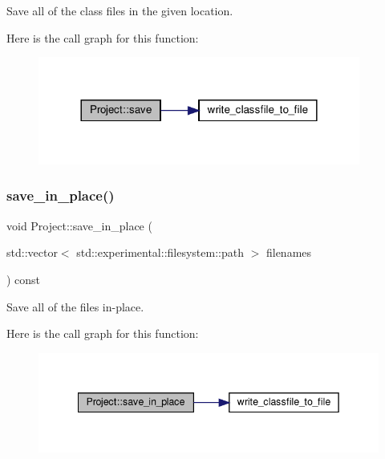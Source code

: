 Save all of the class files in the given location. 

Here is the call graph for this function\+:\nopagebreak
\begin{figure}[H]
\begin{center}
\leavevmode
\includegraphics[width=300pt]{classProject_aff5e62e0e0e3e8c7123a7dd6ae51cb3f_cgraph}
\end{center}
\end{figure}
\mbox{\label{classProject_aecff214fd8b3fc5e855ec925ebe93f59}} 
\subsubsection{\texorpdfstring{save\+\_\+in\+\_\+place()}{save\_in\_place()}}
{\footnotesize\ttfamily void Project\+::save\+\_\+in\+\_\+place (\begin{DoxyParamCaption}\item[{std\+::vector$<$ std\+::experimental\+::filesystem\+::path $>$}]{filenames }\end{DoxyParamCaption}) const}



Save all of the files in-\/place. 

Here is the call graph for this function\+:\nopagebreak
\begin{figure}[H]
\begin{center}
\leavevmode
\includegraphics[width=342pt]{classProject_aecff214fd8b3fc5e855ec925ebe93f59_cgraph}
\end{center}
\end{figure}
\mbox{\label{classProject_afee58125bfee1c7a1871be7805e855fa}} 
